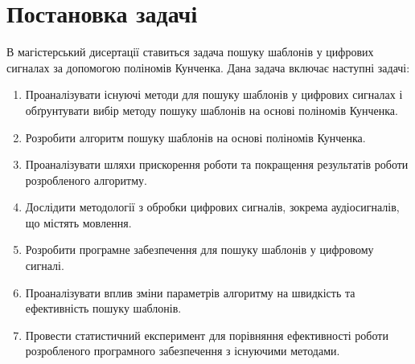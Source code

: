 \chapter{Постановка задачі}

В магістерський дисертації ставиться задача пошуку шаблонів у цифрових сигналах за допомогою поліномів Кунченка.
Дана задача включає наступні задачі:

\begin{enumerate}[label=\arabic*. ]
    \item Проаналізувати існуючі методи для пошуку шаблонів у цифрових сигналах і обґрунтувати вибір методу пошуку
        шаблонів на основі поліномів Кунченка.
    \item Розробити алгоритм пошуку шаблонів на основі поліномів Кунченка.
    \item Проаналізувати шляхи прискорення роботи та покращення результатів роботи розробленого алгоритму.
    \item Дослідити методології з обробки цифрових сигналів, зокрема аудіосигналів, що містять мовлення.
    \item Розробити програмне забезпечення для пошуку шаблонів у цифровому сигналі.
    \item Проаналізувати вплив зміни параметрів алгоритму на швидкість та ефективність пошуку шаблонів.
    \item Провести статистичний експеримент для порівняння ефективності роботи розробленого програмного забезпечення з
        існуючими методами.
\end{enumerate}

